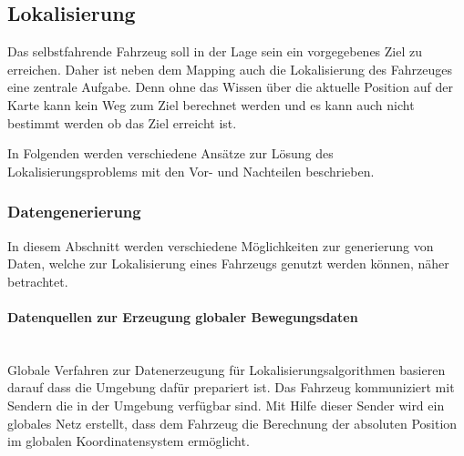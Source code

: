 \subsection{Lokalisierung}
Das selbstfahrende Fahrzeug soll in der Lage sein ein vorgegebenes Ziel zu erreichen. 
Daher ist neben dem Mapping auch die Lokalisierung des Fahrzeuges eine zentrale Aufgabe. 
Denn ohne das Wissen über die aktuelle Position auf der Karte kann kein Weg zum Ziel berechnet werden
und es kann auch nicht bestimmt werden ob das Ziel erreicht ist.

In Folgenden werden verschiedene Ansätze zur Lösung des Lokalisierungsproblems mit den Vor- und Nachteilen beschrieben.

\subsubsection{Datengenerierung}
In diesem Abschnitt werden verschiedene Möglichkeiten zur generierung von Daten, welche zur Lokalisierung eines Fahrzeugs genutzt werden können, näher betrachtet.

\paragraph{Datenquellen zur Erzeugung globaler Bewegungsdaten} \mbox{}\\
Globale Verfahren zur Datenerzeugung für Lokalisierungsalgorithmen basieren darauf dass die Umgebung dafür prepariert ist.
Das Fahrzeug kommuniziert mit Sendern die in der Umgebung verfügbar sind. 
Mit Hilfe dieser Sender wird ein globales Netz erstellt, dass dem Fahrzeug die Berechnung der absoluten Position im 
globalen Koordinatensystem ermöglicht.

